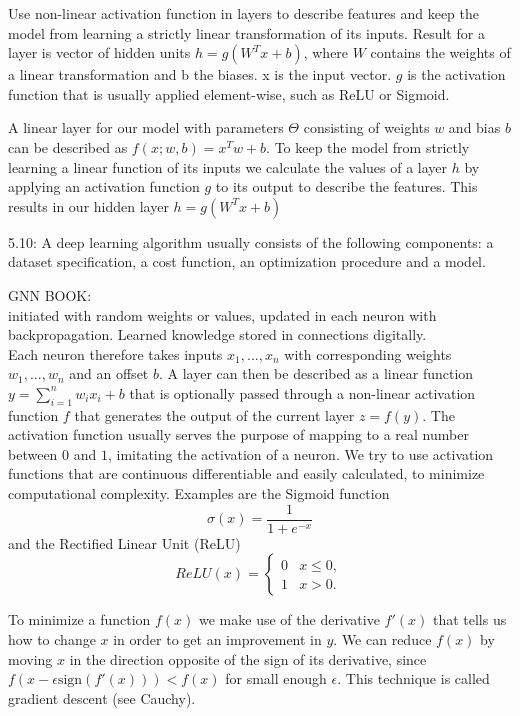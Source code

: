 Use non-linear activation function in layers to describe features and keep the model from learning a strictly linear transformation of its inputs. Result for a layer is vector of hidden units $h=g(W^Tx+b)$, where $W$ contains the weights of a linear transformation and b the biases. x is the input vector. $g$ is the activation function that is usually applied element-wise, such as ReLU or Sigmoid.

A linear layer for our model with parameters $\Theta$ consisting of weights $w$ and bias $b$ can be described as $f(x; w,b)=x^Tw+b$. To keep the model from strictly learning a linear function of its inputs we calculate the values of a layer $h$ by applying an activation function $g$ to its output to describe the features. This results in our hidden layer $h=g(W^Tx+b)$

5.10: A deep learning algorithm usually consists of the following components: a dataset specification, a cost function, an optimization procedure and a model.

GNN BOOK: \\
initiated with random weights or values, updated in each neuron with backpropagation. Learned knowledge stored in connections digitally. \\
Each neuron therefore takes inputs $x_1, ..., x_n$ with corresponding weights $w_1, ..., w_n$ and an offset $b$. A layer can then be described as a linear function $y=\sum_{i=1}^{n} w_i x_i +b$ that is optionally passed through a non-linear activation function $f$ that generates the output of the current layer $z = f(y)$. The activation function usually serves the purpose of mapping to a real number between $0$ and $1$, imitating the activation of a neuron. We try to use activation functions that are continuous differentiable and easily calculated, to minimize computational complexity. Examples are the Sigmoid function 
\begin{equation}
    \sigma (x)= \frac{1}{1+e^{-x}}
\end{equation}
and the Rectified Linear Unit (ReLU)
\begin{equation}
    ReLU(x)=\begin{cases}
        0 & x \leq 0, \\
        1 & x > 0.
    \end{cases}
\end{equation}


To minimize a function $f(x)$ we make use of the derivative $f'(x)$ that tells us how to change $x$ in order to get an improvement in $y$. We can reduce $f(x)$ by moving $x$ in the direction opposite of the sign of its derivative, since $f(x-\epsilon \text{sign}(f'(x))) < f(x)$ for small enough $\epsilon$. This technique is called gradient descent (see Cauchy\cite{cauchy1847methode}).

